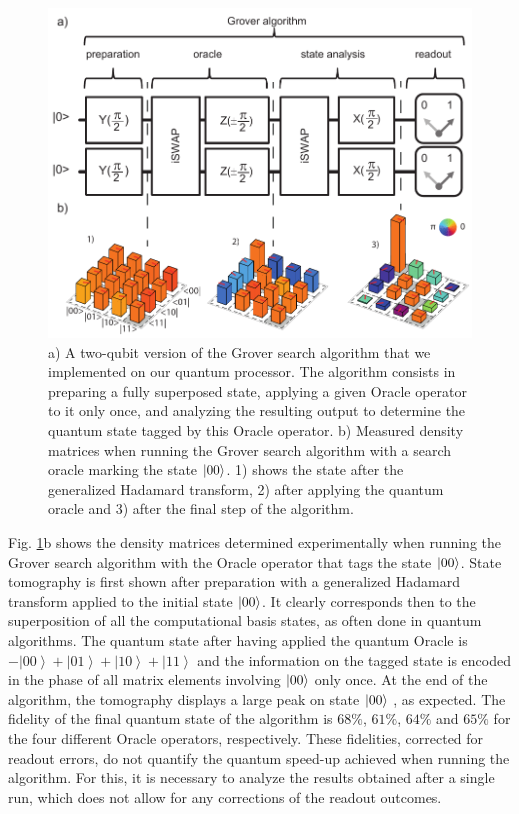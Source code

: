 %
\begin{figure}[ht!]
\centering \includegraphics[width=1\textwidth]{material/figures/2-qubit-processor/grover/grover_schematic_and_density_matrices}
\caption[Schematic of the Grover search algorithm and measured density matrices when running it]{a) A two-qubit version of the Grover search algorithm that we implemented on our quantum processor. The algorithm consists in preparing a fully superposed
state, applying a given Oracle operator to it only
once, and analyzing the resulting output to determine the quantum
state tagged by this Oracle operator. b) Measured density matrices when running the Grover search algorithm
with a search oracle marking the state $\left| 00 \right>$. 1) shows the state
after the generalized Hadamard transform, 2) after applying the quantum
oracle and 3) after the final step of the algorithm.}


\label{fig:grover_algorithm_schematic_and_density_matrices} %
\end{figure}


Fig. \ref{fig:grover_algorithm_schematic_and_density_matrices}b
shows the density matrices determined experimentally when running
the Grover search algorithm with the Oracle operator that tags the
state $\left| 00 \right>$. State tomography is first shown after preparation
with a generalized Hadamard transform applied to the initial state
$\left| 00 \right>$. It clearly corresponds then to the superposition of all
the computational basis states, as often done in quantum algorithms. The quantum state after having applied the quantum
Oracle is $-\left|00\right\rangle +\left|01\right\rangle +\left|10\right\rangle +\left|11\right\rangle $
and the information on the tagged state is encoded in the phase of
all matrix elements involving $\left| 00 \right>$ only once. At the end of
the algorithm, the tomography displays a large peak on state $\left| 00 \right>$
, as expected. The fidelity of the final quantum state of the algorithm
is $68\%$, $61\%$, $64\%$ and $65\%$ for the four different Oracle
operators, respectively. These fidelities, corrected for readout errors,
do not quantify the quantum speed-up achieved when running the algorithm. For this, it is necessary to analyze the results obtained
after a single run, which does not allow for any corrections of the
readout outcomes.


